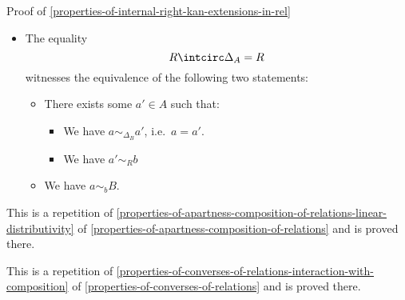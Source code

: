 \begin{Proof}{Proof of \cref{properties-of-internal-right-kan-extensions-in-rel}}
\begin{itemize}
\begin{itemize}
                \item There exists some $b'\in B$ such that:
                    \begin{itemize}
                        \item We have $a\sim_{R}b'$
                        \item We have $b'\sim_{\Delta_{B}}b$, i.e.\ $b'=b$.
                    \end{itemize}
            \end{itemize}
        \item The equality
            \[
                R\intcirc\Delta_{A}%
                =%
                R%
            \]%
            witnesses the equivalence of the following two statements:
            \begin{itemize}
                \item There exists some $a'\in A$ such that:
                    \begin{itemize}
                        \item We have $a\sim_{\Delta_{B}}a'$, i.e.\ $a=a'$.
                        \item We have $a'\sim_{R}b$
                    \end{itemize}
                \item We have $a\sim_{b}B$.
            \end{itemize}
    \end{itemize}

    This is a repetition of \cref{properties-of-apartness-composition-of-relations-linear-distributivity} of \cref{properties-of-apartness-composition-of-relations} and is proved there.

    This is a repetition of \cref{properties-of-converses-of-relations-interaction-with-composition} of \cref{properties-of-converses-of-relations} and is proved there.


\end{Proof}
